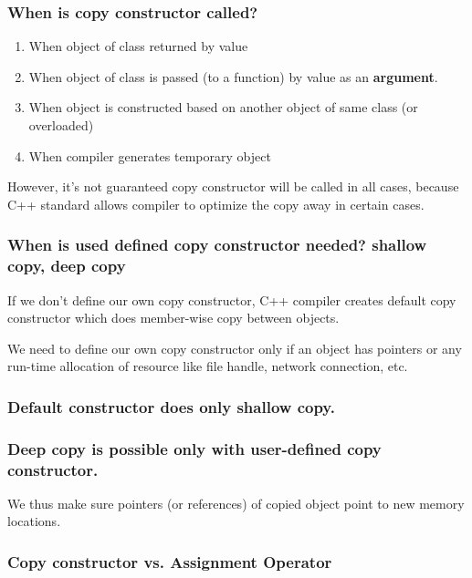 \documentclass[10pt]{amsart}
\begin{document}
\subsubsection{When is copy constructor called? } 
\begin{enumerate}
	\item When object of class returned by value 
	\item When object of class is passed (to a function) by value as an \textbf{argument}.  
	\item When object is constructed based on another object of same class  (or overloaded)  
	\item When compiler generates temporary object  
\end{enumerate}


However, it's not guaranteed copy constructor will be called in all cases, because C++ standard allows compiler to optimize the copy away in certain cases.  

\subsubsection{When is used defined copy constructor needed?  shallow copy, deep copy}  

If we don't define our own copy constructor, C++ compiler creates default copy constructor which does member-wise copy between objects.  

We need to define our own copy constructor only if an object has pointers or any run-time allocation of resource like file handle, network connection, etc.  

\subsubsection{Default constructor does only shallow copy.}  

\subsubsection{Deep copy is possible only with user-defined copy constructor.}  

We thus make sure pointers (or references) of copied object point to new memory locations.  

\subsubsection{Copy constructor vs. Assignment Operator}  
\end{document}
